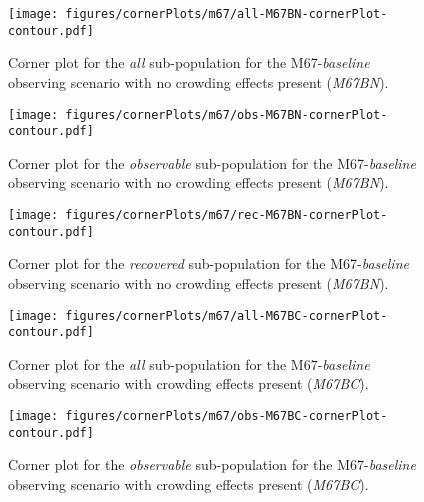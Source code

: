 \documentclass[twocolumn]{aastex63}
\begin{document}
\begin{figure}
    \centering
    \texttt{[image: figures/cornerPlots/m67/all-M67BN-cornerPlot-contour.pdf]}
    \caption{Corner plot for the \textit{all} sub-population for the M67-\textit{baseline} observing scenario with no crowding effects present (\textit{M67BN}).}
    \label{fig:m67bn-All-corner-plot-appendix}
\end{figure}\clearpage
\begin{figure}
    \centering
    \texttt{[image: figures/cornerPlots/m67/obs-M67BN-cornerPlot-contour.pdf]}
    \caption{Corner plot for the \textit{observable} sub-population for the M67-\textit{baseline} observing scenario with no crowding effects present (\textit{M67BN}).}
    \label{fig:m67bn-Obs-corner-plot-appendix}
\end{figure}\clearpage
\begin{figure}
    \centering
    \texttt{[image: figures/cornerPlots/m67/rec-M67BN-cornerPlot-contour.pdf]}
    \caption{Corner plot for the \textit{recovered} sub-population for the M67-\textit{baseline} observing scenario with no crowding effects present (\textit{M67BN}).}
    \label{fig:m67bn-Rec-corner-plot-appendix}
\end{figure}\clearpage
\begin{figure}
    \centering
    \texttt{[image: figures/cornerPlots/m67/all-M67BC-cornerPlot-contour.pdf]}
    \caption{Corner plot for the \textit{all} sub-population for the M67-\textit{baseline} observing scenario with crowding effects present (\textit{M67BC}).}
    \label{fig:m67bc-All-corner-plot-appendix}
\end{figure}\clearpage
\begin{figure}
    \centering
    \texttt{[image: figures/cornerPlots/m67/obs-M67BC-cornerPlot-contour.pdf]}
    \caption{Corner plot for the \textit{observable} sub-population for the M67-\textit{baseline} observing scenario with crowding effects present (\textit{M67BC}).}
    \label{fig:m67bc-Obs-corner-plot-appendix}
\end{figure}\clearpage
\end{document}
